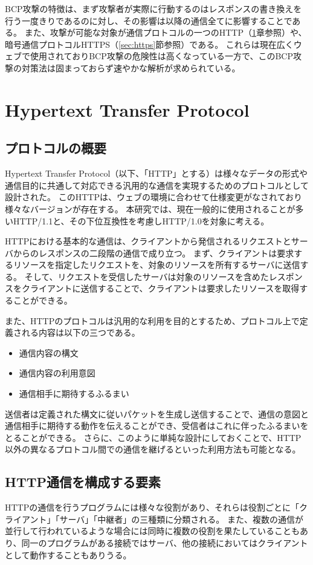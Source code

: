 \documentclass[12pt,a4paper]{jbook}
\begin{document}
BCP攻撃の特徴は、まず攻撃者が実際に行動するのはレスポンスの書き換えを行う一度きりであるのに対し、その影響は以降の通信全てに影響することである。
また、攻撃が可能な対象が通信プロトコルの一つのHTTP（\ref{sec:http}章参照）や、暗号通信プロトコルHTTPS（\ref{sec:https}節参照）である。
これらは現在広くウェブで使用されておりBCP攻撃の危険性は高くなっている一方で、このBCP攻撃の対策法は固まっておらず速やかな解析が求められている。

\section{Hypertext Transfer Protocol}
\label{sec:http}
\subsection{プロトコルの概要}
Hypertext Transfer Protocol（以下、「HTTP」とする）は様々なデータの形式や通信目的に共通して対応できる汎用的な通信を実現するためのプロトコルとして設計された。
このHTTPは、ウェブの環境に合わせて仕様変更がなされており様々なバージョンが存在する。
本研究では、現在一般的に使用されることが多いHTTP/1.1\cite{rfc7230,rfc7231,rfc7232,rfc7233,rfc7234,rfc7235}と、その下位互換性を考慮しHTTP/1.0\cite{rfc1945}を対象に考える。

HTTPにおける基本的な通信は、クライアントから発信されるリクエストとサーバからのレスポンスの二段階の通信で成り立つ。
まず、クライアントは要求するリソースを指定したリクエストを、対象のリソースを所有するサーバに送信する。
そして、リクエストを受信したサーバは対象のリソースを含めたレスポンスをクライアントに送信することで、クライアントは要求したリソースを取得することができる。

また、HTTPのプロトコルは汎用的な利用を目的とするため、プロトコル上で定義される内容は以下の三つである。
\begin{itemize}
\item 通信内容の構文
\item 通信内容の利用意図
\item 通信相手に期待するふるまい
\end{itemize}
送信者は定義された構文に従いパケットを生成し送信することで、通信の意図と通信相手に期待する動作を伝えることができ、受信者はこれに伴ったふるまいをとることができる。
さらに、このように単純な設計にしておくことで、HTTP以外の異なるプロトコル間での通信を継げるといった利用方法も可能となる。

\subsection{HTTP通信を構成する要素}
HTTPの通信を行うプログラムには様々な役割があり、それらは役割ごとに「クライアント」「サーバ」「中継者」の三種類に分類される。
また、複数の通信が並行して行われているような場合には同時に複数の役割を果たしていることもあり、同一のプログラムがある接続ではサーバ、他の接続においてはクライアントとして動作することもありうる。
\end{document}
